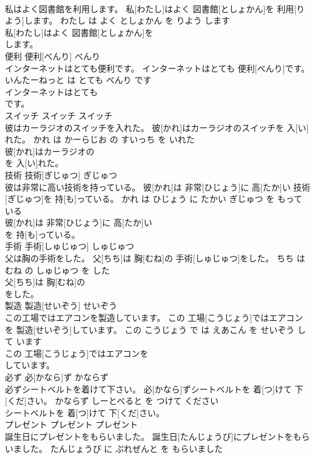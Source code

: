 \documentclass[8pt]{extreport}
\begin{document}
\begin{CJK}{UTF8}{min}
\\	私はよく図書館を利用します。	私[わたし]はよく 図書館[としょかん]を 利用[りよう]します。	わたし は よく としょかん を りよう します	
\\	私[わたし]はよく 図書館[としょかん]を
\\	します。		
\\	便利	便利[べんり]	べんり	
\\	インターネットはとても便利です。	インターネットはとても 便利[べんり]です。	いんたーねっと は とても べんり です	
\\	インターネットはとても
\\	です。		
\\	スイッチ	スイッチ	スイッチ	
\\	彼はカーラジオのスイッチを入れた。	彼[かれ]はカーラジオのスイッチを 入[い]れた。	かれ は かーらじお の すいっち を いれた	
\\	彼[かれ]はカーラジオの
\\	を 入[い]れた。		
\\	技術	技術[ぎじゅつ]	ぎじゅつ	
\\	彼は非常に高い技術を持っている。	彼[かれ]は 非常[ひじょう]に 高[たか]い 技術[ぎじゅつ]を 持[も]っている。	かれ は ひじょう に たかい ぎじゅつ を もって いる	
\\	彼[かれ]は 非常[ひじょう]に 高[たか]い
\\	を 持[も]っている。		
\\	手術	手術[しゅじゅつ]	しゅじゅつ	
\\	父は胸の手術をした。	父[ちち]は 胸[むね]の 手術[しゅじゅつ]をした。	ちち は むね の しゅじゅつ を した	
\\	父[ちち]は 胸[むね]の
\\	をした。		
\\	製造	製造[せいぞう]	せいぞう	
\\	この工場ではエアコンを製造しています。	この 工場[こうじょう]ではエアコンを 製造[せいぞう]しています。	この こうじょう で は えあこん を せいぞう して います	
\\	この 工場[こうじょう]ではエアコンを
\\	しています。		
\\	必ず	必[かなら]ず	かならず	
\\	必ずシートベルトを着けて下さい。	必[かなら]ずシートベルトを 着[つ]けて 下[くだ]さい。	かならず しーとべると を つけて ください	
\\	シートベルトを 着[つ]けて 下[くだ]さい。		
\\	プレゼント	プレゼント	プレゼント	
\\	誕生日にプレゼントをもらいました。	誕生日[たんじょうび]にプレゼントをもらいました。	たんじょうび に ぷれぜんと を もらいました	

\end{CJK}
\end{document}
